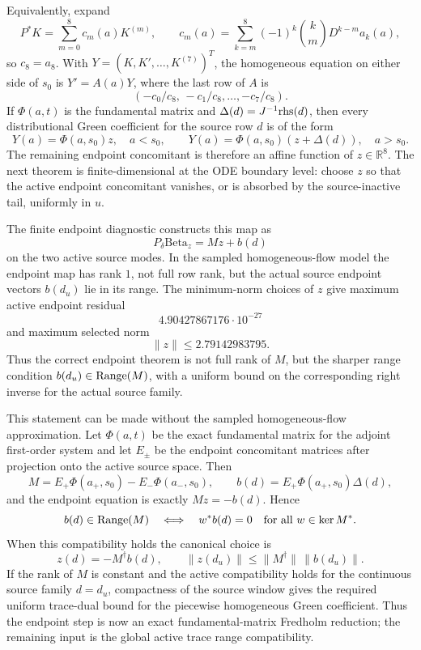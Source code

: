 \documentclass[11pt]{article}
\newcommand{\Beta}{\mathrm{Beta}}
\begin{document}
Equivalently, expand
\[
  P^\ast K=\sum_{m=0}^8 c_m(a)K^{(m)},\qquad
  c_m(a)=\sum_{k=m}^8(-1)^k{k\choose m}D^{k-m}a_k(a),
\]
so \(c_8=a_8\).  With \(Y=(K,K',\ldots,K^{(7)})^T\), the homogeneous equation
on either side of \(s_0\) is \(Y'=A(a)Y\), where the last row of \(A\) is
\[
  (-c_0/c_8,\,-c_1/c_8,\ldots,-c_7/c_8).
\]
If \(\Phi(a,t)\) is the fundamental matrix and
\(\Delta(d)=J^{-1}{\rm rhs}(d)\), then every distributional Green coefficient
for the source row \(d\) is of the form
\[
  Y(a)=\Phi(a,s_0)z,\quad a<s_0,\qquad
  Y(a)=\Phi(a,s_0)(z+\Delta(d)),\quad a>s_0.
\]
The remaining endpoint concomitant is therefore an affine function of
\(z\in\mathbb R^8\).  The next theorem is finite-dimensional at the ODE
boundary level: choose \(z\) so that the active endpoint concomitant vanishes,
or is absorbed by the source-inactive tail, uniformly in \(u\).

The finite endpoint diagnostic constructs this map as
\[
  P_\delta\Beta_z=Mz+b(d)
\]
on the two active source modes.  In the sampled homogeneous-flow model the
endpoint map has rank \(1\), not full row rank, but the actual source endpoint
vectors \(b(d_u)\) lie in its range.  The minimum-norm choices of \(z\) give
maximum active endpoint residual
\[
  4.90427867176\cdot10^{-27}
\]
and maximum selected norm
\[
  \|z\|\le 2.79142983795.
\]
Thus the correct endpoint theorem is not full rank of \(M\), but the sharper
range condition \(b(d_u)\in{\rm Range}(M)\), with a uniform bound on the
corresponding right inverse for the actual source family.

This statement can be made without the sampled homogeneous-flow approximation.
Let \(\Phi(a,t)\) be the exact fundamental matrix for the adjoint first-order
system and let \(E_\pm\) be the endpoint concomitant matrices after projection
onto the active source space.  Then
\[
  M=E_+\Phi(a_+,s_0)-E_-\Phi(a_-,s_0),
  \qquad
  b(d)=E_+\Phi(a_+,s_0)\Delta(d),
\]
and the endpoint equation is exactly \(Mz=-b(d)\).  Hence
\[
  b(d)\in {\rm Range}(M)
  \quad\Longleftrightarrow\quad
  w^\ast b(d)=0\quad\text{for all }w\in\ker M^\ast .
\]
When this compatibility holds the canonical choice is
\[
  z(d)=-M^\dagger b(d),
  \qquad
  \|z(d_u)\|\le \|M^\dagger\|\,\|b(d_u)\|.
\]
If the rank of \(M\) is constant and the active compatibility holds for the
continuous source family \(d=d_u\), compactness of the source window gives the
required uniform trace-dual bound for the piecewise homogeneous Green
coefficient.  Thus the endpoint step is now an exact fundamental-matrix
Fredholm reduction; the remaining input is the global active trace range
compatibility.
\end{document}
